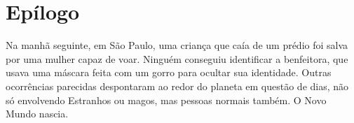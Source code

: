 \chapter*{Epílogo}

Na manhã seguinte, em São Paulo, uma criança que caía de um prédio foi salva
por uma mulher capaz de voar. Ninguém conseguiu identificar a benfeitora, que
usava uma máscara feita com um gorro para ocultar sua identidade.  Outras
ocorrências parecidas despontaram ao redor do planeta em questão de dias, não
só envolvendo Estranhos ou magos, mas pessoas normais também. O Novo Mundo
nascia.
